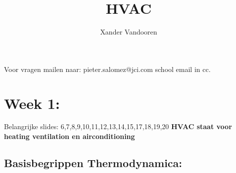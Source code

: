 \documentclass[12pt]{article}
\begin{document}
\begin{titlepage}
    \author{Xander Vandooren}
    \title{HVAC}
\end{titlepage}
\maketitle
\newpage
\tableofcontents
\newpage
{}
Voor vragen mailen naar: pieter.salomez@jci.com
school email in cc.
\section{Week 1:}
Belangrijke slides: 6,7,8,9,10,11,12,13,14,15,17,18,19,20
\textbf{HVAC staat voor heating ventilation en airconditioning}
\subsection{Basisbegrippen Thermodynamica:}
\end{document}
